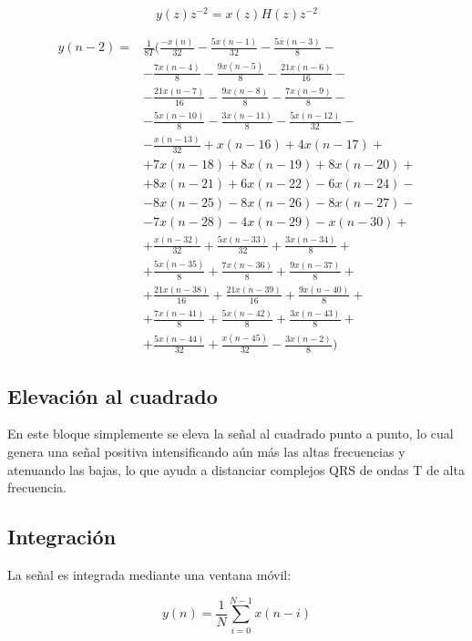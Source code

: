 \documentclass[%
        final,
        notitlepage,
        narroweqnarray,
        inline,
        ]{ieee}
\numberwithin{equation}{section}
\numberwithin{figure}{section}
\numberwithin{table}{section}
\begin{document}
\begin{equation}
y(z) z^{-2} = x(z)H(z) z^{-2}
\end{equation}

\begin{equation}
\begin{split}
y(n-2)= & \frac{1}{8T}(\frac{-x(n)}{32}-\frac{5x(n-1)}{32}-\frac{5x(n-3)}{8}-\\
&-\frac{7x(n-4)}{8}-\frac{9x(n-5)}{8}-\frac{21x(n-6)}{16}-\\
&-\frac{21x(n-7)}{16}-\frac{9x(n-8)}{8}-\frac{7x(n-9)}{8}-\\
&-\frac{5x(n-10)}{8}-\frac{3x(n-11)}{8}-\frac{5x(n-12)}{32}-\\
&-\frac{x(n-13)}{32}+x(n-16)+4x(n-17)+\\
&+7x(n-18)+8x(n-19)+8x(n-20)+\\
&+8x(n-21)+6x(n-22)-6x(n-24)-\\
&-8x(n-25)-8x(n-26)-8x(n-27)-\\
&-7x(n-28)-4x(n-29)-x(n-30)+\\
&+\frac{x(n-32)}{32}+\frac{5x(n-33)}{32}+\frac{3x(n-34)}{8}+\\
&+\frac{5x(n-35)}{8}+\frac{7x(n-36)}{8}+\frac{9x(n-37)}{8}+\\
&+\frac{21x(n-38)}{16}+\frac{21x(n-39)}{16}+\frac{9x(n-40)}{8}+\\
&+\frac{7x(n-41)}{8}+\frac{5x(n-42)}{8}+\frac{3x(n-43)}{8}+\\
&+\frac{5x(n-44)}{32}+\frac{x(n-45)}{32}-\frac{3x(n-2)}{8})
\end{split}
\end{equation}

\subsection{Elevación al cuadrado}
En este bloque simplemente se eleva la señal al cuadrado punto a punto, lo cual genera una señal positiva intensificando aún más las altas frecuencias y atenuando las bajas, lo que ayuda a distanciar complejos QRS de ondas T de alta frecuencia.

\subsection{Integración}
La señal es integrada mediante una ventana móvil:

\begin{equation}
y(n) =  \frac{1}{N}\sum_{i = 0}^{N-1}x(n - i)
\end{equation}
\end{document}
